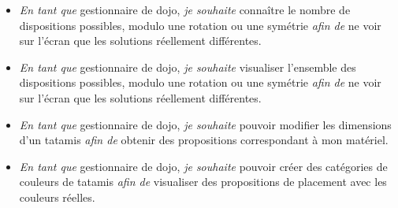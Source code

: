 \begin{itemize}
    \item \emph{En tant que} gestionnaire de dojo, 
    \emph{ je souhaite} connaître le nombre de dispositions possibles, modulo une rotation ou une symétrie 
    \emph{ afin de } ne voir sur l’écran que les solutions réellement différentes.
    \item \emph{En tant que} gestionnaire de dojo, 
    \emph{ je souhaite} visualiser l’ensemble des dispositions possibles, modulo une rotation ou une symétrie 
    \emph{ afin de } ne voir sur l’écran que les solutions réellement différentes.
    \item \emph{En tant que } gestionnaire de dojo,
    \emph{ je souhaite} pouvoir modifier les dimensions d'un tatamis
     \emph{ afin de } obtenir des propositions correspondant à mon matériel.
    \item \emph{En tant que } gestionnaire de dojo,
    \emph{ je souhaite} pouvoir créer des catégories de couleurs de tatamis
     \emph{ afin de } visualiser des propositions de placement avec les couleurs réelles.
\end{itemize}